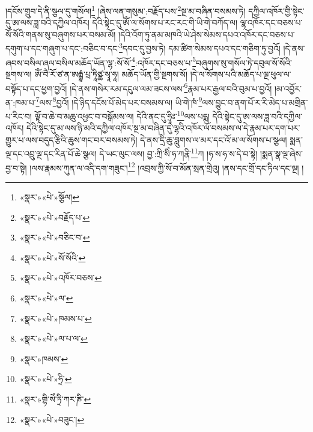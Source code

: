 །དངོས་གྲུབ་དེ་ནི་སྩལ་དུ་གསོལ།\footnote{«སྣར་»«པེ་»སྩོལ།} །ཞེས་ལན་གསུམ་:བརྗོད་པས་\footnote{«སྣར་»«པེ་»བརྗོད་པ་}སྔ་མ་བཞིན་བསམས་ཏེ། དཀྱིལ་འཁོར་གྱི་སྟེང་དུ་ཨ་ལས་ཟླ་བའི་དཀྱིལ་འཁོར། དེའི་སྟེང་དུ་ཨོཾ་ལ་སོགས་པ་རང་རང་གི་ཡི་གེ་བཀོད་ལ། ལྷ་འཁོར་དང་བཅས་པ་སོ་སོའི་གནས་སུ་བཞུགས་པར་བསམ་མོ། །དེའི་འོག་ཏུ་ནམ་མཁའི་ཡེ་ཤེས་སེམས་དཔའ་འཁོར་དང་བཅས་པ་དགུག་པ་དང་གཞུག་པ་དང་:བཅིང་བ་དང་\footnote{«སྣར་»«པེ་»བཅིང་བ་}དབང་དུ་བྱས་ཏེ། དམ་ཚིག་སེམས་དཔའ་དང་གཅིག་ཏུ་བྱའོ། །དེ་ནས་ཞབས་བསིལ་ཞལ་བསིལ་མཆོད་ཡོན་ལྷ་:སོ་སོ་\footnote{«སྣར་»«པེ་»སོ་སོའི་}:འཁོར་དང་བཅས་པ་\footnote{«སྣར་»«པེ་»འཁོར་བཅས་}བཞུགས་སུ་གསོལ་ཏེ་དབུལ་སོ་སོའི་སྔགས་ལ། ཨོཾ་བཻ་རོ་ཙ་ན་ཨརྒྷཾ་པྲ་ཏཱིཙྪ་སྭཱ་ཧཱ། མཆོད་ཡོན་གྱི་སྔགས་སོ། །དེ་ལ་སོགས་པའི་མཆོད་པ་ལྔ་ཕུལ་ལ་བསྟོད་པ་དང་ཕྱག་བྱའོ། །དེ་ནས་གསེར་རམ་དངུལ་ལམ་ཟངས་ལས་\footnote{«སྣར་»«པེ་»ལ་}རྣམ་པར་རྒྱལ་བའི་བུམ་པ་བྱའོ། །མ་འབྱོར་ན་:ཁམ་པ་\footnote{«སྣར་»«པེ་»ཁམས་པ་}ལས་\footnote{«སྣར་»«པེ་»ལ་པ་ལ་}བྱའོ། །དེ་ཉིད་དངོས་པོ་མེད་པར་བསམས་ལ། ཡི་གེ་ཁཾ་\footnote{«སྣར་»ཁམས་}ལས་བྱུང་བ་ནག་པོ་ར་རི་མེད་པ་མགྲིན་པ་རིང་བ། ལྟོ་བ་ཆེ་བ་མཆུ་འཕྱང་བ་བསྒོམས་ལ། དེའི་ནང་དུ་ཧྲཱིཿ་\footnote{«སྣར་»«པེ་»ཧྲི་}ལས་པདྨ། དེའི་སྟེང་དུ་ཨ་ལས་ཟླ་བའི་དཀྱིལ་འཁོར། དེའི་སྟེང་དུ་མ་ལས་ཉི་མའི་དཀྱིལ་འཁོར་སྔ་མ་བཞིན་དུ་ལྷའི་འཁོར་ལོ་བསམས་ལ་དེ་རྣམ་པར་དག་པར་གྱུར་པ་ལས་བདུད་རྩིའི་ཆུས་གང་བར་བསམས་ཏེ། དེ་ནས་དྲི་ཆུ་བླུགས་ལ་མར་དང་འོ་མ་ལ་སོགས་པ་སྩལ། སྨན་ལྔ་དང་འབྲུ་ལྔ་དང་རིན་པོ་ཆེ་སྩལ། དེ་ཡང་ལུང་ལས། བྱ་:ཀྲི་སིཾ་ཧ་ཀརྣི་\footnote{«སྣར་»གྷི་སེཾ་ཏྲི་ཀར་ཎི་}ཀ །ཧ་ས་ཧ་ས་དེ་བ་སྟེ། །སྨན་སྣ་ལྔ་ཞེས་བྱ་བ་སྟེ། །ལས་རྣམས་ཀུན་ལ་འདི་དག་གཟུང་།\footnote{«སྣར་»«པེ་»བཟུང་།} །འབྲས་ཀྱི་སོ་བ་མོན་སྲན་གྲེའུ། །ནས་དང་གྲོ་དང་ཏིལ་དང་ལྔ། །
